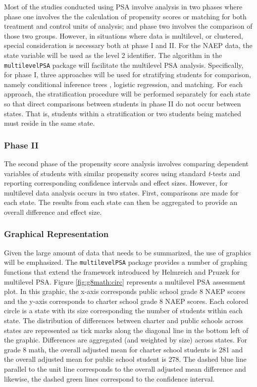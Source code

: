 \documentclass[letterpaper,12p,twoside]{article} %
\begin{document}
Most of the studies conducted using PSA involve analysis in two phases where phase one involves the the calculation of propensity scores or matching for both treatment and control units of analysis; and phase two involves the comparison of those two groups. However, in situations where data is multilevel, or clustered, special consideration is necessary both at phase I and II. For the NAEP data, the state variable will be used as the level 2 identifier. The algorithm in the \texttt{multilevelPSA} package  will facilitate the multilevel PSA analysis. Specifically, for phase I, three approaches will be used for stratifying students for comparison, namely conditional inference trees , logistic regression, and matching. For each approach, the stratification procedure will be performed separately for each state so that direct comparisons between students in phase II do not occur between states. That is, students within a stratification or two students being matched must reside in the same state.

\subsubsection{Phase II}
The second phase of the propensity score analysis involves comparing dependent variables of students with similar propensity scores using standard \textit{t}-tests and reporting corresponding confidence intervals and effect sizes. However, for multilevel data analysis occurs in two states. First, comparisons are made for each state. The results from each state can then be aggregated to provide an overall difference and effect size. 

\subsubsection{Graphical Representation}
Given the large amount of data that needs to be summarized, the use of graphics will be emphasized. The \texttt{multilevelPSA} package provides a number of graphing functions that extend the framework introduced by Helmreich and Pruzek for multilevel PSA. Figure \ref{fig:g8math:circ} represents a multilevel PSA assessment plot. In this graphic, the x-axis corresponds public school grade 8 NAEP scores and the y-axis corresponds to charter school grade 8 NAEP scores. Each colored circle is a state with its size corresponding the number of students within each state. The distribution of differences between charter and public schools across states are represented as tick marks along the diagonal line in the bottom left of the graphic. Differences are aggregated (and weighted by size) across states. For grade 8 math, the overall adjusted mean for charter school students is 281 and the overall adjusted mean for public school student is 278. The dashed blue line parallel to the unit line corresponds to the overall adjusted mean difference and likewise, the dashed green lines correspond to the confidence interval.
\end{document}
